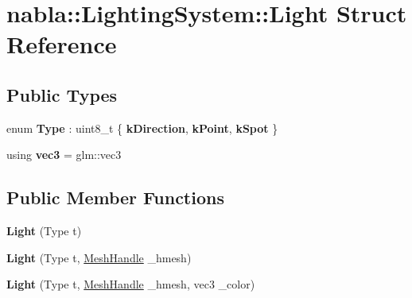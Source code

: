 \hypertarget{structnabla_1_1_lighting_system_1_1_light}{}\section{nabla\+::Lighting\+System\+::Light Struct Reference}
\label{structnabla_1_1_lighting_system_1_1_light}
\subsection*{Public Types}
\begin{DoxyCompactItemize}
\item 
\mbox{\label{structnabla_1_1_lighting_system_1_1_light_a4e66961637f2eb67ba976a10953a5853}} 
enum {\bfseries Type} \+: uint8\+\_\+t \{ {\bfseries k\+Direction}, 
{\bfseries k\+Point}, 
{\bfseries k\+Spot}
 \}
\item 
\mbox{\label{structnabla_1_1_lighting_system_1_1_light_acf07d7245e5f4af19dac5b6071a62d93}} 
using {\bfseries vec3} = glm\+::vec3
\end{DoxyCompactItemize}
\subsection*{Public Member Functions}
\begin{DoxyCompactItemize}
\item 
\mbox{\label{structnabla_1_1_lighting_system_1_1_light_adfda653a92531db7e6c81615ec52fc20}} 
{\bfseries Light} (Type t)
\item 
\mbox{\label{structnabla_1_1_lighting_system_1_1_light_a63a12fb3e9d938824eb621f11ab40f82}} 
{\bfseries Light} (Type t, \mbox{\hyperlink{classnabla_1_1renderer_1_1_handle}{Mesh\+Handle}} \+\_\+hmesh)
\item 
\mbox{\label{structnabla_1_1_lighting_system_1_1_light_a178fd50addc917647d0c29a7e094e3ed}} 
{\bfseries Light} (Type t, \mbox{\hyperlink{classnabla_1_1renderer_1_1_handle}{Mesh\+Handle}} \+\_\+hmesh, vec3 \+\_\+color)
\end{DoxyCompactItemize}
